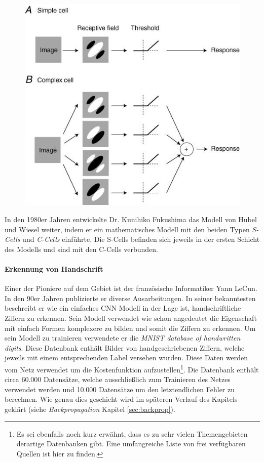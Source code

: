 \begin{figure}[!htb]
	\centering
	\includegraphics[width=.6\linewidth]{img/simpleVsComplex}
	\label{fig:simpleVsComplex}
\end{figure}

In den 1980er Jahren entwickelte Dr. Kunihiko Fukushima das Modell von Hubel und Wiesel weiter, indem er ein mathematisches Modell mit den beiden Typen \emph{S-Cells} und \emph{C-Cells} einführte. Die S-Cells befinden sich jeweils in der ersten Schicht des Modells und sind mit den C-Cells verbunden. 

\paragraph{Erkennung von Handschrift}
Einer der Pioniere auf dem Gebiet ist der französische Informatiker Yann LeCun. In den 90er Jahren publizierte er diverse Ausarbeitungen. In seiner bekanntesten beschreibt er wie ein einfaches CNN Modell in der Lage ist, handschriftliche Ziffern zu erkennen. Sein Modell verwendet wie schon angedeutet die Eigenschaft mit einfach Formen komplexere zu bilden und somit die Ziffern zu erkennen. Um sein Modell zu trainieren verwendete er die \emph{MNIST database of handwritten digits}. Diese Datenbank enthält Bilder von handgeschriebenen Ziffern, welche jeweils mit einem entsprechenden Label versehen wurden. Diese Daten werden vom Netz verwendet um die Kostenfunktion aufzustellen\footnote{Es sei ebenfalls noch kurz erwähnt, dass es zu sehr vielen Themengebieten derartige Datenbanken gibt. Eine umfangreiche Liste von frei verfügbaren Quellen ist hier \cite{openDataSets} zu finden.}. Die Datenbank enthält circa 60.000 Datensätze, welche ausschließlich zum Trainieren des Netzes verwendet werden und 10.000 Datensätze um den letztendlichen Fehler zu berechnen. Wie genau dies geschieht wird im späteren Verlauf des Kapitels geklärt (siehe \emph{Backpropagation} Kapitel \ref{sec:backprop}).

